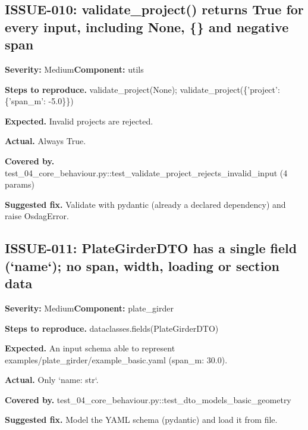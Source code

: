 \subsection*{ISSUE-010: validate\_\allowbreak{}project() returns True for every input, including None, \{\} and negative span}
\textbf{Severity:} Medium\quad \textbf{Component:} utils\par
\textbf{Steps to reproduce.} validate\_\allowbreak{}project(None); validate\_\allowbreak{}project(\{'project': \{'span\_\allowbreak{}m': -5.\allowbreak{}0\}\})\par
\textbf{Expected.} Invalid projects are rejected.\allowbreak{}\par
\textbf{Actual.} Always True.\allowbreak{}\par
\textbf{Covered by.} test\_\allowbreak{}04\_\allowbreak{}core\_\allowbreak{}behaviour.\allowbreak{}py::\allowbreak{}test\_\allowbreak{}validate\_\allowbreak{}project\_\allowbreak{}rejects\_\allowbreak{}invalid\_\allowbreak{}input (4 params)\par
\textbf{Suggested fix.} Validate with pydantic (already a declared dependency) and raise OsdagError.\allowbreak{}

\subsection*{ISSUE-011: PlateGirderDTO has a single field (`name`); no span, width, loading or section data}
\textbf{Severity:} Medium\quad \textbf{Component:} plate\_\allowbreak{}girder\par
\textbf{Steps to reproduce.} dataclasses.\allowbreak{}fields(PlateGirderDTO)\par
\textbf{Expected.} An input schema able to represent examples/\allowbreak{}plate\_\allowbreak{}girder/\allowbreak{}example\_\allowbreak{}basic.\allowbreak{}yaml (span\_\allowbreak{}m: 30.\allowbreak{}0).\allowbreak{}\par
\textbf{Actual.} Only `name: str`.\allowbreak{}\par
\textbf{Covered by.} test\_\allowbreak{}04\_\allowbreak{}core\_\allowbreak{}behaviour.\allowbreak{}py::\allowbreak{}test\_\allowbreak{}dto\_\allowbreak{}models\_\allowbreak{}basic\_\allowbreak{}geometry\par
\textbf{Suggested fix.} Model the YAML schema (pydantic) and load it from file.\allowbreak{}

